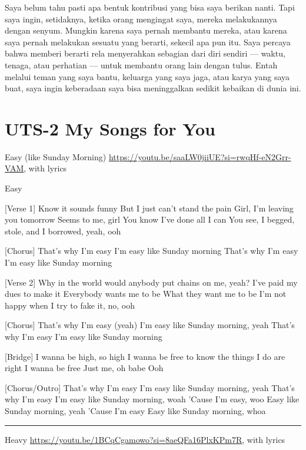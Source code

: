 \documentclass[
  letterpaper,
  DIV=11,
  numbers=noendperiod]{scrreprt}
\begin{document}
Saya belum tahu pasti apa bentuk kontribusi yang bisa saya berikan
nanti. Tapi saya ingin, setidaknya, ketika orang mengingat saya, mereka
melakukannya dengan senyum. Mungkin karena saya pernah membantu mereka,
atau karena saya pernah melakukan sesuatu yang berarti, sekecil apa pun
itu. Saya percaya bahwa memberi berarti rela menyerahkan sebagian dari
diri sendiri --- waktu, tenaga, atau perhatian --- untuk membantu orang
lain dengan tulus. Entah melalui teman yang saya bantu, keluarga yang
saya jaga, atau karya yang saya buat, saya ingin keberadaan saya bisa
meninggalkan sedikit kebaikan di dunia ini.


\chapter{UTS-2 My Songs for You}\label{uts-2-my-songs-for-you}

Easy (like Sunday Morning)
\url{https://youtu.be/saaLW0jiiUE?si=rwqHf-eN2Grr-VAM}, with lyrics

Easy

{[}Verse 1{]} Know it sounds funny But I just can't stand the pain Girl,
I'm leaving you tomorrow Seems to me, girl You know I've done all I can
You see, I begged, stole, and I borrowed, yeah, ooh

{[}Chorus{]} That's why I'm easy I'm easy like Sunday morning That's why
I'm easy I'm easy like Sunday morning

{[}Verse 2{]} Why in the world would anybody put chains on me, yeah?
I've paid my dues to make it Everybody wants me to be What they want me
to be I'm not happy when I try to fake it, no, ooh

{[}Chorus{]} That's why I'm easy (yeah) I'm easy like Sunday morning,
yeah That's why I'm easy I'm easy like Sunday morning

{[}Bridge{]} I wanna be high, so high I wanna be free to know the things
I do are right I wanna be free Just me, oh babe Ooh

{[}Chorus/Outro{]} That's why I'm easy I'm easy like Sunday morning,
yeah That's why I'm easy I'm easy like Sunday morning, woah 'Cause I'm
easy, woo Easy like Sunday morning, yeah 'Cause I'm easy Easy like
Sunday morning, whoa

\begin{center}\rule{0.5\linewidth}{0.5pt}\end{center}

Heavy \url{https://youtu.be/1BCqCgamowo?si=8aeQFa16PlxKPm7R}, with
lyrics
\end{document}

